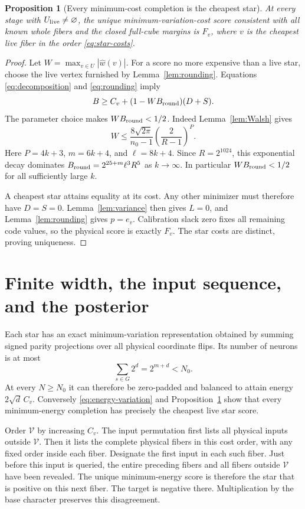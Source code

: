 \documentclass[11pt]{article}
\newtheorem{proposition}[theorem]{Proposition}
\theoremstyle{remark}\newtheorem{remark}[theorem]{Remark}
\begin{document}
\begin{proposition}[Every minimum-cost completion is the cheapest star]
\label{prop:classification}
At every stage with $U_{\rm live}\ne\varnothing$, the unique
minimum-variation-cost score consistent with all known whole fibers and
the closed full-cube margins is $F_v$, where $v$ is the cheapest live
fiber in the order \eqref{eq:star-costs}.
\end{proposition}

\begin{proof}
Let $W=\max_{v\in U}|\widehat w(v)|$. For a score no more expensive than
a live star, choose the live vertex furnished by
Lemma~\ref{lem:rounding}. Equations \eqref{eq:decomposition} and
\eqref{eq:rounding} imply
\[
 B\ge C_v+(1-WB_{\rm round})(D+S).
\]
The parameter choice makes $WB_{\rm round}<1/2$. Indeed
Lemma~\ref{lem:Walsh} gives
\[
 W\le\frac{8\sqrt{2\pi}}{n_0-1}
       \left(\frac{2}{R-1}\right)^P.
\]
Here $P=4k+3$, $m=6k+4$, and $\ell=8k+4$. Since
$R=2^{1024}$, this exponential decay dominates
$B_{\rm round}=2^{25+m}\ell^3R^5$ as $k\to\infty$.
In particular $WB_{\rm round}<1/2$ for all sufficiently large $k$.

A cheapest star attains equality at its cost. Any other minimizer must
therefore have $D=S=0$. Lemma~\ref{lem:variance} then gives $L=0$, and
Lemma~\ref{lem:rounding} gives $p=e_v$. Calibration slack zero fixes all
remaining code values, so the physical score is exactly $F_v$. The star
costs are distinct, proving uniqueness.
\end{proof}

\section{Finite width, the input sequence, and the posterior}

Each star has an exact minimum-variation representation obtained by
summing signed parity projections over all physical coordinate flips. Its number of neurons is at most
\[
 \sum_{s\in G}2^d=2^{m+d}<N_0.
\]
At every $N\ge N_0$ it can therefore be zero-padded and balanced to attain
energy $2\sqrt d\,C_v$. Conversely
\eqref{eq:energy-variation} and Proposition~\ref{prop:classification}
show that every minimum-energy completion has precisely the cheapest
live star score.

Order $\mathcal V$ by increasing $C_v$. The input permutation first lists
all physical inputs outside $\mathcal V$. Then it lists the complete
physical fibers in this cost order, with any fixed order inside each fiber.
Designate the first input in each such fiber. Just before this input is
queried, the entire preceding fibers and all fibers outside $\mathcal V$ have
been revealed. The unique minimum-energy score is therefore the star that is
positive on this next fiber. The target is negative there. Multiplication
by the base character preserves this disagreement.
\end{document}
